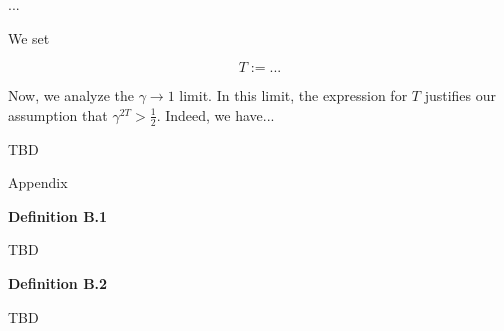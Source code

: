 \documentclass[a4paper]{article}
\newcommand{\Co}[1]{}
\begin{document}
...

We set

$$T:=...$$

Now, we analyze the $\gamma\rightarrow1$ limit. In this limit, the expression for $T$ justifies our assumption that $\gamma^{2T}>\frac{1}{2}$. Indeed, we have...

TBD

\begin{Huge}Appendix\end{Huge}

\textbf{Definition B.1}\Co{b}

TBD %

\textbf{Definition B.2}\Co{b}

TBD %
\end{document}
